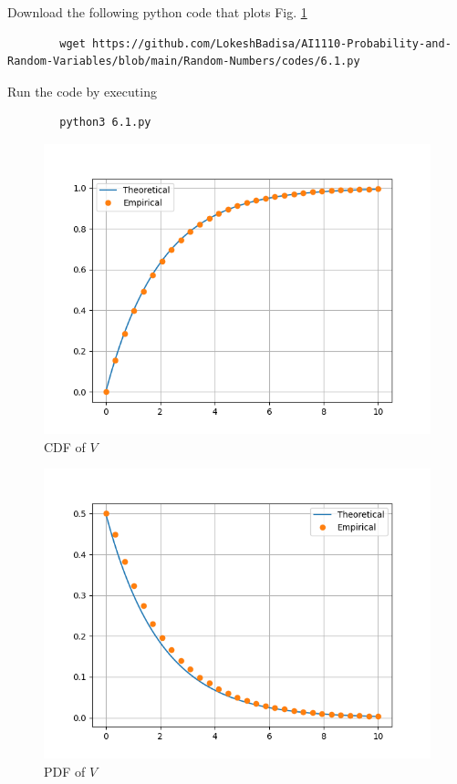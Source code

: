 \documentclass[journal,12pt,twocolumn]{IEEEtran}
\numberwithin{equation}{section}
\renewcommand\thesection{\arabic{section}}
\begin{document}
\begin{enumerate}[label=\thesection.\arabic*,ref=\thesection.\theenumi]
	Download the following python code that plots Fig. \ref{fig-6.1} 
	\begin{lstlisting}
		wget https://github.com/LokeshBadisa/AI1110-Probability-and-Random-Variables/blob/main/Random-Numbers/codes/6.1.py
	\end{lstlisting}
	Run the code by executing
	\begin{lstlisting}
		python3 6.1.py
	\end{lstlisting}
	\begin{figure}
		\centering
		\includegraphics[width=\columnwidth]{./figs/6.1.png}
		\caption{CDF of $V$}
		\label{fig-6.1}
	\end{figure}
	\begin{figure}
		\centering
		\includegraphics[width=\columnwidth]{./figs/6.2.png}
		\caption{PDF of $V$}
		\label{fig-6.2}
	\end{figure}
	

\end{enumerate}
\end{document}
